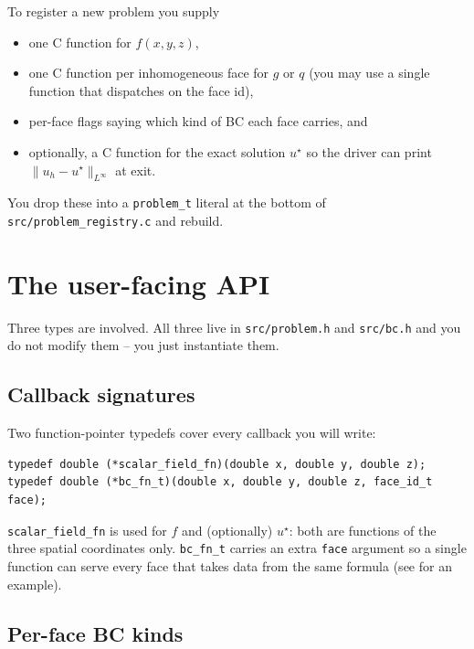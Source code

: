 \documentclass[11pt]{article}
\newcommand{\Linf}{L^{\infty}}
\begin{document}
To register a new problem you supply
\begin{itemize}[topsep=0pt,itemsep=2pt]
\item one C function for $f(x, y, z)$,
\item one C function per inhomogeneous face for $g$ or $q$ (you may
      use a single function that dispatches on the face id),
\item per-face flags saying which kind of BC each face carries, and
\item optionally, a C function for the exact solution $u^\star$ so
      the driver can print $\|u_h - u^\star\|_{\Linf}$ at exit.
\end{itemize}
You drop these into a \texttt{problem\_t} literal at the bottom of
\texttt{src/problem\_registry.c} and rebuild.

\section{The user-facing API}\label{sec:api}

Three types are involved.  All three live in \texttt{src/problem.h}
and \texttt{src/bc.h} and you do not modify them -- you just
instantiate them.

\subsection{Callback signatures}

Two function-pointer typedefs cover every callback you will write:
\begin{lstlisting}
typedef double (*scalar_field_fn)(double x, double y, double z);
typedef double (*bc_fn_t)(double x, double y, double z, face_id_t face);
\end{lstlisting}
\texttt{scalar\_field\_fn} is used for $f$ and (optionally) $u^\star$:
both are functions of the three spatial coordinates only.
\texttt{bc\_fn\_t} carries an extra \texttt{face} argument so a single
function can serve every face that takes data from the same formula
(see  for an example).

\subsection{Per-face BC kinds}
\end{document}
